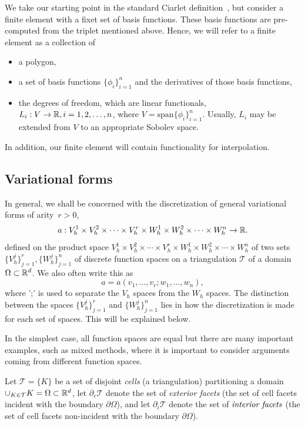 We take our starting point in the standard Ciarlet
definition~\cite{Cia78}, but consider a finite element with a fixet
set of basis functions.  These basis functions are pre-computed from
the triplet mentioned above. Hence, we will refer to a finite
element as a collection of
\begin{itemize}
\item a polygon,  
\item a set of basis functions $\{\phi_i\}_{i=1}^n$ and
the derivatives of those basis functions,
\item the degrees of freedom, which are linear functionals, $L_i : V
\rightarrow \mathbb{R}, i = 1, 2, \ldots, n$, where $V = \mathrm{span}\{\phi_i\}_{i=1}^n$.  Usually,
$L_i$ may be extended from $V$ to an appropriate Sobolev space.
\end{itemize}
In addition, our finite element will contain functionality
for interpolation. 

\subsection{Variational forms}

In general, we shall be concerned with the discretization of general
variational forms of arity~$r > 0$,
\begin{equation} \label{eq:variationalform}
  a : V_h^1 \times V_h^2 \times \cdots \times V_h^r \times
  W_h^1 \times W_h^2 \times \cdots \times W_h^n \rightarrow \mathbb{R}.
\end{equation}
defined on the product space $V_h^1 \times V_h^2 \times \cdots \times
V_h^r \times W_h^1 \times W_h^2 \times \cdots \times W_h^n$ of two sets
$\{V_h^j\}_{j=1}^r, \{W_h^j\}_{j=1}^n$ of discrete function spaces on
a triangulation $\mathcal{T}$ of a domain $\Omega \subset \mathbb{R}^d$. 
We also often write this as 
\begin{equation}
a = a(v_1, \ldots, v_r; w_1, \ldots, w_n), 
\end{equation}
where ';' is used to separate the $V_h$ spaces from the $W_h$ spaces. 
The distinction between the spaces $\{V_h^j\}_{j=1}^r$ and
$\{W_h^j\}_{j=1}^n$ lies in how the discretization is made for each
set of spaces. This will be explained below.

In the simplest case, all function spaces are equal but there are many
important examples, such as mixed methods, where it is important to
consider arguments coming from different function spaces.

Let $\mathcal{T} = \{K\}$ be a set of disjoint \emph{cells} (a
triangulation) partitioning a domain $\cup_{K\in\mathcal{T}} K =
\Omega \subset \mathbb{R}^d$, let $\partial_e \mathcal{T}$ denote the set of
\emph{exterior facets} (the set of cell facets
incident with the boundary $\partial \Omega$), and let $\partial_i
\mathcal{T}$ denote the set of $\emph{interior facets}$ (the set of
cell facets non-incident with the boundary $\partial \Omega$).

